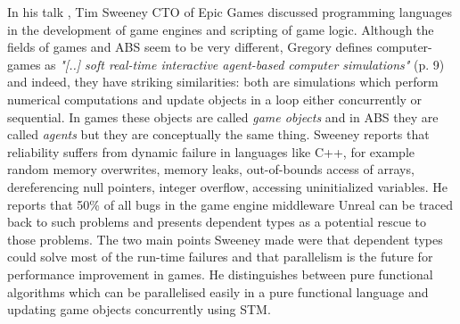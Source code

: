 In his talk \cite{sweeney_next_2006}, Tim Sweeney CTO of Epic Games discussed programming languages in the development of game engines and scripting of game logic. Although the fields of games and ABS seem to be very different, Gregory \cite{gregory_game_2018} defines computer-games as \textit{"[..] soft real-time interactive agent-based computer simulations"} (p. 9) and indeed, they have striking similarities: both are simulations which perform numerical computations and update objects in a loop either concurrently or sequential. In games these objects are called \textit{game objects} and in ABS they are called \textit{agents} but they are conceptually the same thing.  Sweeney reports that reliability suffers from dynamic failure in languages like C++, for example random memory overwrites, memory leaks, out-of-bounds access of arrays, dereferencing null pointers, integer overflow, accessing uninitialized variables. He reports that 50\% of all bugs in the game engine middleware Unreal can be traced back to such problems and presents dependent types as a potential rescue to those problems. The two main points Sweeney made were that dependent types could solve most of the run-time failures and that parallelism is the future for performance improvement in games. He distinguishes between pure functional algorithms which can be parallelised easily in a pure functional language and updating game objects concurrently using STM.